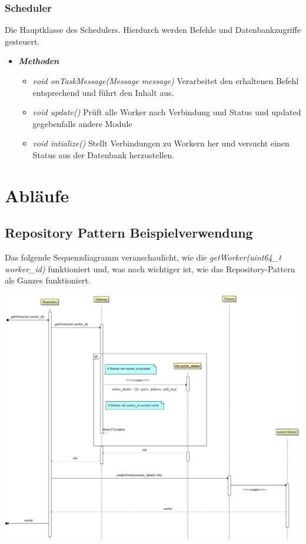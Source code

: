 \documentclass[a4paper,12pt]{article}
\begin{document}
\clearpage

\subsubsection{Scheduler}

Die Hauptklasse des Schedulers. Hierdurch werden Befehle und Datenbankzugriffe gesteuert.
\begin{itemize}[label={}]
	
	\item \textit{\textbf{Methoden}}
	\begin{itemize}[label={\textbullet}]
		
		\item \textit{void onTaskMessage(Message message)} Verarbeitet den erhaltenen Befehl entsprechend und führt den Inhalt aus.
		
		\item \textit{void update()} Prüft alle Worker nach Verbindung und Status und updated gegebenfalls andere Module
		
		\item \textit{void intialize()} Stellt Verbindungen zu Workern her und versucht einen Status aus der Datenbank herzustellen. 
		
	\end{itemize}
	
\end{itemize}



\clearpage

\section{Abläufe}
\subsection{Repository Pattern Beispielverwendung}

Das folgende Sequenzdiagramm veranschaulicht, wie die \textit{getWorker(uint64\_t worker\_id)} funktioniert und, was noch wichtiger ist, wie das Repository-Pattern als Ganzes funktioniert.

\includegraphics[width=\textwidth]{repository_sequence_diagram}
\end{document}
